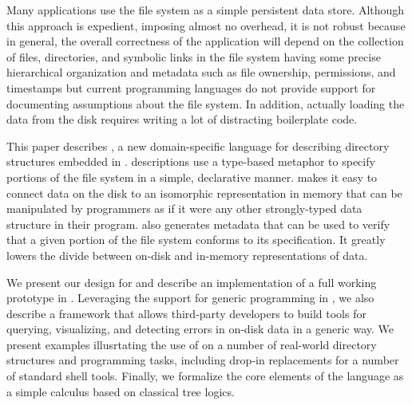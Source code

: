 Many applications use the file system as a simple persistent data
store.  Although this approach is expedient, imposing almost no
overhead, it is not robust because in general, the overall correctness
of the application will depend on the collection of files,
directories, and symbolic links in the file system having some precise
hierarchical organization and metadata such as file ownership,
permissions, and timestamps but current programming languages do not
provide support for documenting assumptions about the file system. In
addition, actually loading the data from the disk requires writing a
lot of distracting boilerplate code.

This paper describes \forest{}, a new domain-specific language for
describing directory structures embedded in \haskell{}. \forest{}
descriptions use a type-based metaphor to specify portions of the file
system in a simple, declarative manner.  \forest{} makes it easy to
connect data on the disk to an isomorphic representation in memory
that can be manipulated by programmers as if it were any other
strongly-typed data structure in their program.  \forest{} also
generates metadata that can be used to verify that a given portion of
the file system conforms to its specification.  It greatly lowers the
divide between on-disk and in-memory representations of data.

We present our design for \forest{} and describe an implementation of
a full working prototype in \haskell{}. Leveraging the support for
generic programming in \haskell{}, we also describe a framework that
allows third-party developers to build tools for querying,
visualizing, and detecting errors in on-disk data in a generic way. We
present examples illusrtating the use of \forest{} on a number of
real-world directory structures and programming tasks, including
drop-in replacements for a number of standard shell tools. Finally, we
formalize the core elements of the language as a simple calculus based
on classical tree logics.